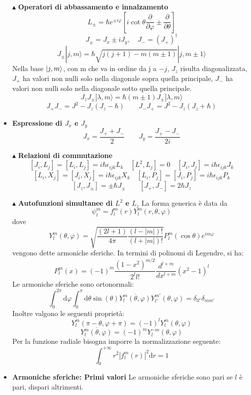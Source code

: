 \documentclass{book}
\newcommand{\g}{\textbf}
\newcommand{\e}{\begin{equation}}
\newcommand{\ex}{\end{equation} }
\renewcommand{\it}{\item[$\cdot$]}
\begin{document}
\begin{multicols}{4}
\begin{itemize}
    \item [$\blacktriangle$] \g{Operatori di abbassamento e innalzamento}
        \e{L_\pm = \hbar e^{\pm i\varphi} \left[i\cot\theta \frac{\partial}{\partial\varphi} \pm \frac{\partial}{\partial\theta}\right]} \ex
        \e{J_\pm = J_x \pm iJ_y, \quad J_- = (J_+)^\dagger} \ex
        \e{J_\pm |j, m\rangle = \hbar \sqrt{j(j+1) - m(m \pm 1)} |j, m \pm 1\rangle \label{azione J+ J-}} \ex
        Nella base $\ket{j,m}$, con m che va in ordine da j a $-j$, $J_{z}$ risulta diagonalizzata, $J_{+}$ ha valori non nulli solo nella diagonale sopra quella principale, $J_{-}$ ha valori non nulli solo nella diagonale sotto quella principale. 
         \e{J_z J_\pm |\lambda, m\rangle = \hbar(m \pm 1) J_\pm |\lambda, m\rangle} \ex
         \e{J_{+}J_{-} = J^{2} - J_{z}\left(J_{z} - \hbar\right) \qquad J_{-}J_{+} = J^{2} - J_{z}\left(J_{z} + \hbar\right)}\ex

    \it \g{Espressione di $J_x$ e $J_y$}
        \e{J_x = \frac{J_+ + J_-}{2} \qquad J_y = \frac{J_+ - J_-}{2i} \label{Jx e Jy}} \ex

        

    \item [$\blacktriangle$] \g{Relazioni di commutazione}
        \e{[J_{i},L_{j}] = [L_i, L_j] = i\hbar \epsilon_{ijk} L_k \quad [L^2, L_j] = 0 \quad[J_i, J_j] = i\hbar \epsilon_{ijk} J_k } \ex \e{[L_i, X_j] = [J_i, X_j] = i\hbar \epsilon_{ijk} X_k \quad [L_i, P_j] = [J_i, P_j] = i\hbar \epsilon_{ijk} P_k} \ex
         \e{[J_z, J_\pm] = \pm \hbar J_\pm \qquad [J_+, J_-] = 2\hbar J_z} \ex
       

\item [$\blacktriangle$] \g{Autofunzioni simultanee di $L^{2}$ e $L_{z}$}
La forma generica è data da 
\e{\psi_{l}^{m} = f_{l}^{m}(r)Y_{l}^{m}(r,\theta,\varphi) \label{autofunzioni simultanee L2 e Lz}}\ex
dove 
    \e{Y^m_l(\theta, \varphi) = \sqrt{\frac{(2l + 1)}{4\pi} \frac{(l - |m|)!}{(l + |m|)!}} P^m_l(\cos\theta) e^{im\varphi}} \ex
    vengono dette armoniche sferiche. In termini di polinomi di Legendre, si ha:
    \e{P^m_l(x) = (-1)^m \frac{(1 - x^2)^{m/2}}{2^l l!} \frac{d^{l+m}}{dx^{l+m}} (x^2 - 1)^l} \ex
    Le armoniche sferiche sono ortonormali:
    \e{\int_{0}^{2\pi}\text{d}\varphi\int_{0}^{\pi}\text{d}\theta \sin(\theta)\overline{Y_{l}^{m}(\theta,\varphi)}Y_{l'}^{m'}(\theta,\varphi) = \delta_{ll'}\delta_{mm'}}\ex
    Inoltre valgono le seguenti proprietà:
    \e{Y_{l}^{m}(\pi - \theta,\varphi + \pi) = (-1)^{l}Y_{l}^{m}(\theta,\varphi)}\ex
    \e{\overline{Y_{l}^{m}(\theta,\varphi)} = (-1)^{m}Y_{l}^{-m}(\theta,\varphi)}\ex
    Per la funzione radiale bisogna imporre la normalizzazione seguente:
    \e{\int_{0}^{+\infty} r^{2} |f_{l}^{m}(r)|^{2}\text{d}r = 1}\ex
\it \g{Armoniche sferiche: Primi valori}
    Le armoniche sferiche sono pari se $l$ è pari, dispari altrimenti.


\end{itemize}
\end{multicols}
\end{document}
